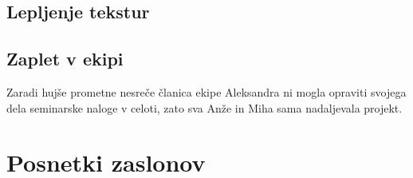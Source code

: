 \documentclass[10pt,a4paper]{article}
\begin{document}
\subsection{Lepljenje tekstur}
\subsection{Zaplet v ekipi}
Zaradi hujše prometne nesreče članica ekipe Aleksandra ni mogla opraviti svojega dela 
seminarske naloge v celoti, zato sva Anže in Miha sama nadaljevala projekt. 
\pagebreak
\section{Posnetki zaslonov}
\end{document}
